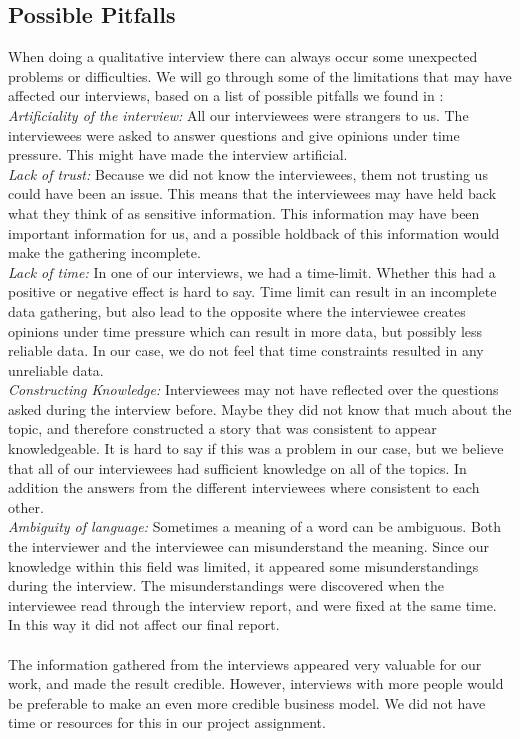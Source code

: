 \subsection{Possible Pitfalls}
When doing a qualitative interview there can always occur some unexpected problems or difficulties. We will go through some of the limitations that may have affected our interviews, based on a list of possible pitfalls we found in \cite{interview}:\\
\emph{Artificiality of the interview:} All our interviewees were strangers to us. The interviewees were asked to answer questions  and give opinions under time pressure. This might have made the interview artificial. \\
\emph{Lack of trust:} Because we did not know the interviewees, them not trusting us could have been an issue. This means that the interviewees may have held back what they think of as sensitive information. This information may have been important information for us, and a possible holdback of this information would make the gathering incomplete. \\
\emph{Lack of time:} In one of our interviews, we had a time-limit. Whether this had a positive or negative effect is hard to say. Time limit can result in an incomplete data gathering, but also lead to the opposite where the interviewee creates opinions under time pressure which can result in more data, but possibly less reliable data. In our case, we do not feel that time constraints resulted in any unreliable data. \\
\emph{Constructing Knowledge:} Interviewees may not have reflected over the questions asked during the interview before. Maybe they did not know that much about the topic, and therefore constructed a story that was consistent to appear knowledgeable. It is hard to say if this was a problem in our case, but we believe that all of our interviewees had sufficient knowledge on all of the topics. In addition the answers from the different interviewees where consistent to each other. \\
\emph{Ambiguity of language:} Sometimes a meaning of a word can be ambiguous. Both the interviewer and the interviewee can misunderstand the meaning. Since our knowledge within this field was limited, it appeared some misunderstandings during the interview. The misunderstandings were discovered when the interviewee read through the interview report, and were fixed at the same time. In this way it did not affect our final report.  \\ \\
The information gathered from the interviews appeared very valuable for our work, and made the result credible. However, interviews with more people would be preferable to make an even more credible business model. We did not have time or resources for this in our project assignment. 


